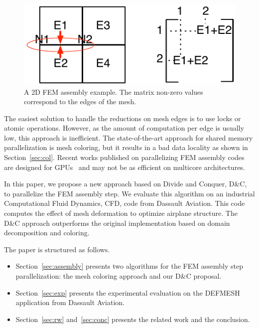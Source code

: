 \documentclass[10pt]{IOS-Book-Article}
\begin{document}
\begin{figure}[tp]
 \includegraphics[scale=0.6]{FEM_ass.pdf}
 \caption{A 2D FEM assembly example. The matrix non-zero values correspond to the edges of the mesh.}
 \label{fig:2Dasm}
\end{figure}

The easiest solution to handle the reductions on mesh edges is to use locks or atomic operations.
However, as the amount of computation per edge is usually low, this approach is inefficient.
The state-of-the-art approach for shared memory parallelization is mesh coloring, but it results in a bad data locality as shown in Section~\ref{sec:col}. Recent works published on parallelizing FEM assembly codes are designed for GPUs~\cite{cecka2011assembly,CPUGPUasm}
and may not be as efficient on multicore architectures.


In this paper, we propose a new approach based on Divide and Conquer, D\&C, to parallelize the FEM assembly step.
We evaluate this algorithm on an industrial Computational Fluid Dynamics, CFD, code from Dassault Aviation.
This code computes the effect of mesh deformation to optimize airplane structure.
The D\&C approach outperforms the original implementation based on domain decomposition and coloring.

The paper is structured as follows.
\begin{itemize}
\item Section~\ref{sec:assembly} presents  two algorithms for the FEM assembly step parallelization: the mesh coloring approach and our D\&C proposal.
\item Section~\ref{sec:exp} presents the experimental evaluation on the DEFMESH application from Dassault Aviation.
\item Section~\ref{sec:rw} and~\ref{sec:conc} presents the related work and the conclusion.
\end{itemize}

\end{document}
